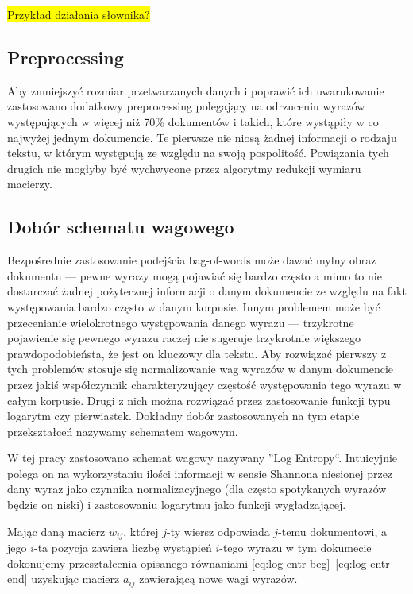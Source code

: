 \documentclass[11pt,a4paper]{article}
\newcommand{\todo}[1]{\colorbox{yellow}{#1}}
\begin{document}
\todo{Przykład działania słownika?}

\subsection{Preprocessing}

Aby zmniejszyć rozmiar przetwarzanych danych i poprawić ich uwarukowanie
zastosowano dodatkowy preprocessing polegający na odrzuceniu wyrazów
występujących w więcej niż 70\% dokumentów i takich, które wystąpiły w co
najwyżej jednym dokumencie. Te pierwsze nie niosą żadnej informacji o rodzaju
tekstu, w którym występują ze względu na swoją pospolitość. Powiązania tych
drugich nie mogłyby być wychwycone przez algorytmy redukcji wymiaru macierzy.

\subsection{Dobór schematu wagowego}

Bezpośrednie zastosowanie podejścia bag-of-words może dawać mylny obraz
dokumentu --- pewne wyrazy mogą pojawiać się bardzo często a mimo to nie
dostarczać żadnej pożytecznej informacji o danym dokumencie ze względu na fakt
występowania bardzo często w danym korpusie. Innym problemem może być
przecenianie wielokrotnego występowania danego wyrazu --- trzykrotne pojawienie
się pewnego wyrazu raczej nie sugeruje trzykrotnie większego prawdopodobieństa,
że jest on kluczowy dla tekstu. Aby rozwiązać pierwszy z tych problemów stosuje
się normalizowanie wag wyrazów w danym dokumencie przez jakiś współczynnik
charakteryzujący częstość występowania tego wyrazu w całym korpusie. Drugi z
nich można rozwiązać przez zastosowanie funkcji typu logarytm czy pierwiastek.
Dokładny dobór zastosowanych na tym etapie przekształceń nazywamy schematem
wagowym.

W tej pracy zastosowano schemat wagowy nazywany ''Log Entropy``.  Intuicyjnie
polega on na wykorzystaniu ilości informacji w sensie Shannona niesionej przez
dany wyraz jako czynnika normalizacyjnego (dla często spotykanych wyrazów
będzie on niski) i zastosowaniu logarytmu jako funkcji wygładzającej.

Mając daną macierz $w_{ij}$, której $j$-ty wiersz odpowiada $j$-temu
dokumentowi, a jego $i$-ta pozycja zawiera liczbę wystąpień $i$-tego wyrazu w
tym dokumecie dokonujemy przeształcenia opisanego równaniami
\ref{eq:log-entr-beg}--\ref{eq:log-entr-end} uzyskując macierz $a_{ij}$
zawierającą nowe wagi wyrazów.
\end{document}
